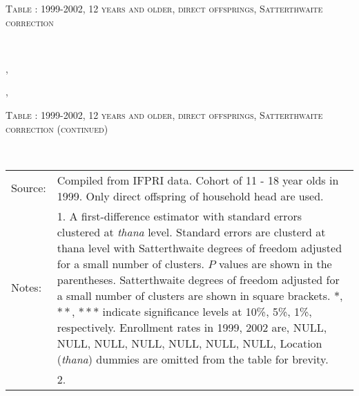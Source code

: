 \begin{table}\hfil\textsc{\footnotesize Table \thetable: 1999-2002, 12 years and older, direct offsprings, Satterthwaite correction\label{zEm.1999.10.sameN}}\\\setlength{\tabcolsep}{1pt}\renewcommand{\arraystretch}{.675}\hspace{-2em}\hfil{}\\\renewcommand{\arraystretch}{1}\end{table}, \addtocounter{table}{-1}, \begin{table}\hfil\textsc{\footnotesize Table \thetable: 1999-2002, 12 years and older, direct offsprings, Satterthwaite correction (continued)\label{zEm.1999.10.sameN}}\\\setlength{\tabcolsep}{1pt}\renewcommand{\arraystretch}{.675}\hspace{-2em}\hfil{}\\\renewcommand{\arraystretch}{1}\hfil\begin{tabular}{>{\hfill\scriptsize}p{1cm}<{}>{\scriptsize}p{12cm}<{\hfill}} Source:& Compiled from IFPRI data. Cohort of 11 - 18 year olds in 1999. Only direct offspring of household head are used.\\[-1ex] Notes:& 1. A first-difference estimator with standard errors clustered at \textit{thana} level. Standard errors are clusterd at thana level with Satterthwaite degrees of freedom adjusted for a small number of clusters. $P$ values are shown in the parentheses. Satterthwaite degrees of freedom adjusted for a small number of clusters are shown in square brackets. $*$, $**$, $***$ indicate significance levels at 10\%, 5\%, 1\%, respectively. Enrollment rates in 1999, 2002 are, NULL, NULL, NULL, NULL, NULL, NULL, NULL, Location (\textit{thana}) dummies are omitted from the table for brevity. \\ & 2.   \end{tabular} \end{table}
